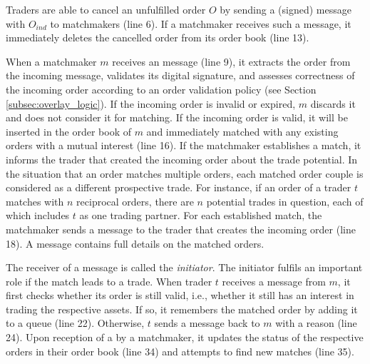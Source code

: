 Traders are able to cancel an unfulfilled order $ O $ by sending a (signed) \MsgCancelOrder{} message with $ O_{ind} $ to matchmakers (line 6).
If a matchmaker receives such a message, it immediately deletes the cancelled order from its order book (line 13).

When a matchmaker $ m $ receives an \MsgOrder{} message (line 9), it extracts the order from the incoming message, validates its digital signature, and assesses correctness of the incoming order according to an order validation policy (see Section \ref{subsec:overlay_logic}).
If the incoming order is invalid or expired, $ m $ discards it and does not consider it for matching. 
If the incoming order is valid, it will be inserted in the order book of $ m $ and immediately matched with any existing orders with a mutual interest (line 16). 
If the matchmaker establishes a match, it informs the trader that created the incoming order about the trade potential.
In the situation that an order matches multiple orders, each matched order couple is considered as a different prospective trade. 
For instance, if an order of a trader $ t $ matches with $ n $ reciprocal orders, there are $ n $ potential trades in question, each of which includes $ t $ as one trading partner.
For each established match, the matchmaker sends a \MsgMatch{} message to the trader that creates the incoming order (line 18).
A \MsgMatch{} message contains full details on the matched orders.


The receiver of a \MsgMatch{} message is called the \emph{initiator}.
The initiator fulfils an important role if the match leads to a trade.
When trader $ t $ receives a \MsgMatch{} message from $ m $, it first checks whether its order is still valid, i.e., whether it still has an interest in trading the respective assets. 
If so, it remembers the matched order by adding it to a queue (line 22).
Otherwise, $ t $ sends a \MsgRejectMatch{} message back to $ m $ with a reason (line 24).
Upon reception of a \MsgRejectMatch{} by a matchmaker, it updates the status of the respective orders in their order book (line 34) and attempts to find new matches (line 35).

